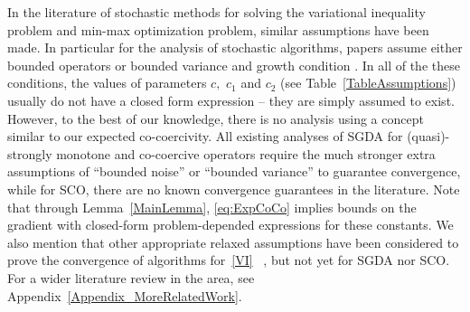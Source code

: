 \documentclass{article}
\begin{document}
In the literature of stochastic methods for solving the variational inequality problem and min-max optimization problem, similar assumptions have been made. In particular for the analysis of stochastic algorithms, papers assume either bounded operators \citep{Nemirovski-Juditsky-Lan-Shapiro-2009,abernethy2021last} or bounded variance \citep{juditsky2011solving,yang2020global,lin2020gradient,luo2020stochastic,tran2020hybrid} and growth condition \citep{lin2020finite}. In all of the these conditions, the values of parameters $c,$ $c_1$ and $c_2$ (see Table~\ref{TableAssumptions}) usually do not have a closed form expression -- they are simply assumed to exist. However, to the best of our knowledge, there is no analysis using a concept similar to our expected co-coercivity. All existing analyses of SGDA for (quasi)-strongly monotone and co-coercive operators require the much stronger extra assumptions of ``bounded noise” or ``bounded variance” to guarantee convergence, while for SCO, there are no known convergence guarantees in the literature. Note that through Lemma~\ref{MainLemma}, \eqref{eq:ExpCoCo} implies bounds on the gradient with closed-form problem-depended expressions for these constants. We also mention that other appropriate relaxed assumptions have been considered to prove the convergence of algorithms for~\eqref{VI} ~\citep{hsieh2020explore,mishchenko2020revisiting,chavdarova2019reducing, loizou2020stochastic}, but not yet for SGDA nor SCO. For a wider literature review in the area, see Appendix~\ref{Appendix_MoreRelatedWork}.
\end{document}
